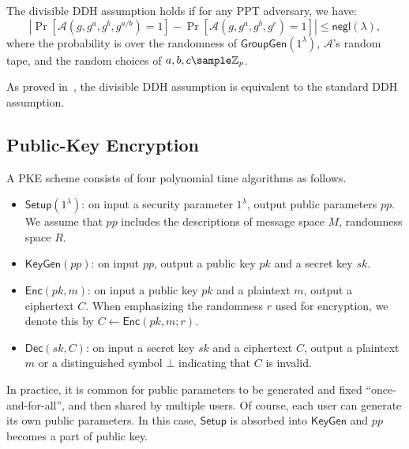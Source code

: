 \documentclass[a4paper,10pt]{article}
\begin{document}
\begin{definition}
The divisible DDH assumption holds if for any PPT adversary, we have: 
\begin{equation*}
\left|\Pr[\mathcal{A}(g, g^a, g^b, g^{a/b}) = 1] - \Pr[\mathcal{A}(g, g^a, g^b, g^c) = 1] \right| 
\leq \mathsf{negl}(\lambda),
\end{equation*}
where the probability is over the randomness of $\mathsf{GroupGen}(1^\lambda)$, $\mathcal{A}$'s random tape,  
and the random choices of $a, b, c \sample \mathbb{Z}_p$.  
\end{definition}
As proved in~\cite{BDZ2003}, the divisible DDH assumption is equivalent to the standard DDH assumption.
 

\subsection{Public-Key Encryption}
A PKE scheme consists of four polynomial time algorithms as follows. 
\begin{itemize} \itemsep 1pt \parskip 0pt \parsep 0pt
\item $\mathsf{Setup}(1^\lambda)$: on input a security parameter $1^\lambda$, 
    output public parameters $pp$. We assume that $pp$ includes the descriptions of message space $M$, 
    randomness space $R$. 

\item $\mathsf{KeyGen}(pp)$: on input $pp$, output a public key $pk$ and a secret key $sk$.

\item $\mathsf{Enc}(pk, m)$: on input a public key $pk$ and a plaintext $m$, output a ciphertext $C$. 
    When emphasizing the randomness $r$ used for encryption, we denote this by $C \leftarrow \mathsf{Enc}(pk, m; r)$.   

\item $\mathsf{Dec}(sk, C)$: on input a secret key $sk$ and a ciphertext $C$, 
    output a plaintext $m$ or a distinguished symbol $\bot$ indicating that $C$ is invalid.
\end{itemize}

\begin{remark}
In practice, it is common for public parameters to be generated and fixed ``once-and-for-all'', 
and then shared by multiple users. Of course, each user can generate its own public parameters. 
In this case, $\mathsf{Setup}$ is absorbed into $\mathsf{KeyGen}$ and $pp$ becomes a part of public key. 
\end{remark}
\end{document}

